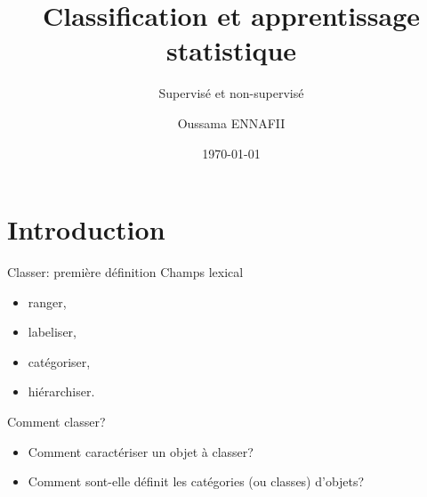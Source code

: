 \documentclass[8pt]{beamer}
\title{Classification et apprentissage statistique}
\subtitle{Supervisé et non-supervisé}
\author{Oussama ENNAFII}
\institute{ENSG}
\date{\today}
\begin{document}
	\begin{frame}[plain]
		\titlepage{}
	\end{frame}

	\section{Introduction}

		\begin{frame}{Classer: première définition}
			Champs lexical
			\begin{itemize}
				\item<2-> ranger,
				\item<3-> labeliser,
				\item<4-> catégoriser,
				\item<5-> hiérarchiser.
			\end{itemize}
		\end{frame}
		
		\begin{frame}{Comment classer?}
			\begin{itemize}
					\item<1-> Comment caractériser un objet à classer?
					\item<2-> Comment sont-elle définit les catégories (ou classes) d'objets?
			\end{itemize}
		\end{frame}
		
\end{document}
